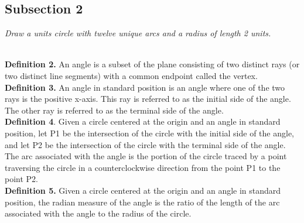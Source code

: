 \documentclass[11pt]{article} %
\newcommand\tab[1][1cm]{\hspace*{#1}}
\begin{document}
\subsection{Subsection 2}
\textit{Draw a units circle with twelve unique arcs and a radius of length 2 units.} \\

\\
\tab \textbf{Definition 2.} An angle is a subset of the plane consisting of two distinct rays (or two
distinct line segments) with a common endpoint called the vertex.\\
\tab \textbf{Definition 3.} An angle in standard position is an angle where one of the two rays is the
positive x-axis. This ray is referred to as the initial side of the angle. The other ray is
referred to as the terminal side of the angle.\\
\tab \textbf{Definition 4}. Given a circle centered at the origin and an angle in standard position,
let P1 be the intersection of the circle with the initial side of the angle, and let P2 be the
intersection of the circle with the terminal side of the angle. 
The arc associated with the angle is the portion of the circle traced by a point traversing the circle in a counterclockwise
direction from the point P1 to the point P2.\\
\tab \textbf{Definition 5.} Given a circle centered at the origin and an angle in standard position, the
radian measure of the angle is the ratio of the length of the arc associated with the angle
to the radius of the circle.\\
\end{document}
